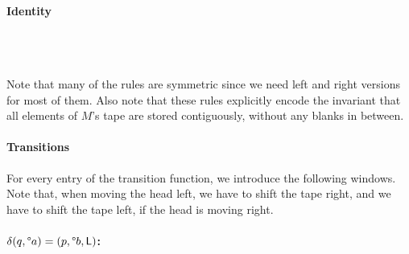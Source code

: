 \documentclass[a4paper,UKenglish,cleveref, autoref]{lipics-v2019}
\begin{document}
\paragraph*{Identity}
\begin{center}
  \rewwin{\blank & \blank & \blank}{\blank & \blank & \blank} 
  \\[3ex]
   \\[3ex]
\end{center}

Note that many of the rules are symmetric since we need left and right versions for most of them. 
Also note that these rules explicitly encode the invariant that all elements of $M$'s tape are stored contiguously, without any blanks \blank{} in between.

\paragraph*{Transitions}

For every entry of the transition function, we introduce the following windows. Note that, when moving the head left, we have to shift the tape right, and we have to shift the tape left, if the head is moving right.

\paragraph*{$\delta(q, \degree a) = (p, \degree b, \textsf{L})$:}
\begin{center}
   \\[3ex]
   \\[3ex]
\end{center}
\end{document}
